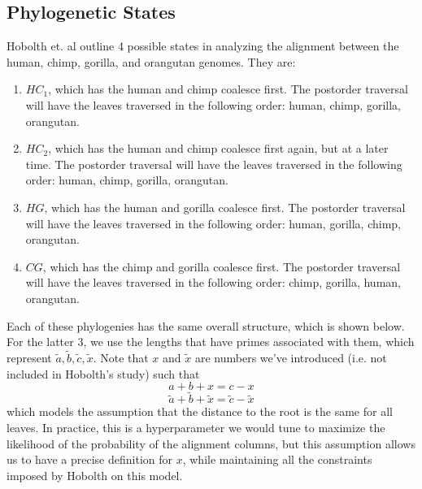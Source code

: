 \documentclass[12pt]{article}
\begin{document}
    \subsection{Phylogenetic States}
    Hobolth et. al outline 4 possible states in analyzing the alignment between the human, chimp, gorilla, and orangutan genomes. They are:
    \begin{enumerate}
        \item $HC_1$, which has the human and chimp coalesce first. The postorder traversal will have the leaves traversed in the following order: human, chimp, gorilla, orangutan.
        \item $HC_2$, which has the human and chimp coalesce first again, but at a later time. The postorder traversal will have the leaves traversed in the following order: human, chimp, gorilla, orangutan.
        \item $HG$, which has the human and gorilla coalesce first. The postorder traversal will have the leaves traversed in the following order: human, gorilla, chimp, orangutan.
        \item $CG$, which has the chimp and gorilla coalesce first. The postorder traversal will have the leaves traversed in the following order: chimp, gorilla, human, orangutan.
    \end{enumerate}
    Each of these phylogenies has the same overall structure, which is shown below. For the latter 3, we use the lengths that have primes associated with them, which represent $\widetilde{a}, \widetilde{b}, \widetilde{c}, \widetilde{x}$. Note that $x$ and $\widetilde{x}$ are numbers we've introduced (i.e. not included in Hobolth's study) such that
    $$a + b + x = c - x$$
    $$\widetilde{a} + \widetilde{b} + \widetilde{x} = \widetilde{c} - \widetilde{x}$$
    which models the assumption that the distance to the root is the same for all leaves. In practice, this is a hyperparameter we would tune to maximize the likelihood of the probability of the alignment columns, but this assumption allows us to have a precise definition for $x$, while maintaining all the constraints imposed by Hobolth on this model.
\end{document}
